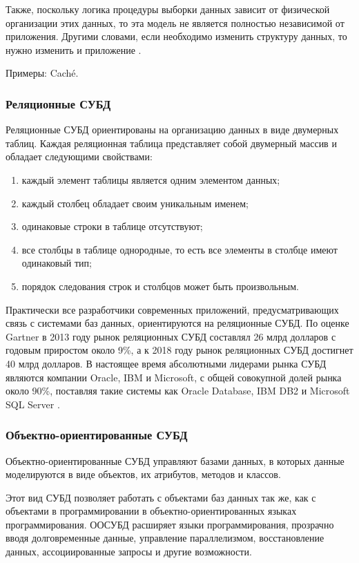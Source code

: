 \documentclass[a4paper,14pt]{extreport}
\begin{document}
Также, поскольку логика процедуры выборки данных зависит от физической организации этих данных, то эта модель не является полностью независимой от приложения. Другими словами, если необходимо изменить структуру данных, то нужно изменить и приложение \cite{scienceforum}.

Примеры: Caché.

\subsubsection*{Реляционные СУБД}
Реляционные СУБД ориентированы на организацию данных в виде двумерных таблиц. Каждая реляционная таблица представляет собой двумерный массив и обладает следующими свойствами:

\begin{enumerate}
	\setlength\itemsep{0.01em}
	\item каждый элемент таблицы является одним элементом данных;
	\item каждый столбец обладает своим уникальным именем;
	\item одинаковые строки в таблице отсутствуют;
	\item все столбцы в таблице однородные, то есть все элементы в столбце имеют одинаковый тип;
	\item порядок следования строк и столбцов может быть произвольным.
\end{enumerate}

Практически все разработчики современных приложений, предусматривающих связь с системами баз данных, ориентируются на реляционные СУБД. По оценке Gartner в 2013 году рынок реляционных СУБД составлял 26 млрд долларов с годовым приростом около 9\%, а к 2018 году рынок реляционных СУБД достигнет 40 млрд долларов. В настоящее время абсолютными лидерами рынка СУБД являются компании Oracle, IBM и Microsoft, с общей совокупной долей рынка около 90\%, поставляя такие системы как Oracle Database, IBM DB2 и Microsoft SQL Server \cite{dbms}.

\subsubsection*{Объектно-ориентированные СУБД}
Объектно-ориентированные СУБД управляют базами данных, в которых данные моделируются в виде объектов, их атрибутов, методов и классов.

Этот вид СУБД позволяет работать с объектами баз данных так же, как с объектами в программировании в объектно-ориентированных языках программирования. ООСУБД расширяет языки программирования, прозрачно вводя долговременные данные, управление параллелизмом, восстановление данных, ассоциированные запросы и другие возможности.
\end{document}
